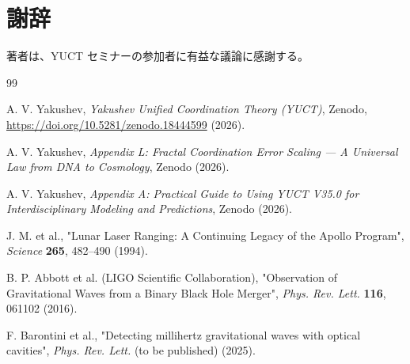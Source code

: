 \documentclass[12pt,a4paper]{article}
\begin{document}
	\section*{謝辞}
	
	著者は、YUCT セミナーの参加者に有益な議論に感謝する。
	
	\begin{thebibliography}{99}
		
		A. V. Yakushev, \emph{Yakushev Unified Coordination Theory (YUCT)}, Zenodo, \url{https://doi.org/10.5281/zenodo.18444599} (2026).
		
		A. V. Yakushev, \emph{Appendix L: Fractal Coordination Error Scaling — A Universal Law from DNA to Cosmology}, Zenodo (2026).
		
		A. V. Yakushev, \emph{Appendix A: Practical Guide to Using YUCT V35.0 for Interdisciplinary Modeling and Predictions}, Zenodo (2026).
		
		J. M. et al., "Lunar Laser Ranging: A Continuing Legacy of the Apollo Program", \emph{Science} \textbf{265}, 482–490 (1994).
		
		B. P. Abbott et al. (LIGO Scientific Collaboration), "Observation of Gravitational Waves from a Binary Black Hole Merger", \emph{Phys. Rev. Lett.} \textbf{116}, 061102 (2016).
		
		F. Barontini et al., "Detecting millihertz gravitational waves with optical cavities", \emph{Phys. Rev. Lett.} (to be published) (2025).
		
	\end{thebibliography}
	
\end{document}
